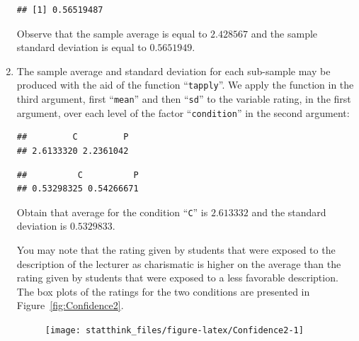 \documentclass[]{krantz}
\makeatletter
\newenvironment{Shaded}{\begin{snugshade}}{\end{snugshade}}
\newcommand{\KeywordTok}[1]{\textcolor[rgb]{0.13,0.29,0.53}{\textbf{#1}}}
\newcommand{\OperatorTok}[1]{\textcolor[rgb]{0.81,0.36,0.00}{\textbf{#1}}}
\newcommand{\NormalTok}[1]{#1}
\newenvironment{kframe}{%
\medskip{}
\setlength{\fboxsep}{.8em}
 \def\at@end@of@kframe{}%
 \ifinner\ifhmode%
  \def\at@end@of@kframe{\end{minipage}}%
  \begin{minipage}{\columnwidth}%
 \fi\fi%
 \def\FrameCommand##1{\hskip\@totalleftmargin \hskip-\fboxsep
 \colorbox{shadecolor}{##1}\hskip-\fboxsep
     \hskip-\linewidth \hskip-\@totalleftmargin \hskip\columnwidth}%
 \MakeFramed {\advance\hsize-\width
   \@totalleftmargin\z@ \linewidth\hsize
   \@setminipage}}%
 {\par\unskip\endMakeFramed%
 \at@end@of@kframe}
\renewenvironment{Shaded}{\begin{kframe}}{\end{kframe}}
\theoremstyle{definition}
\theoremstyle{definition}
\theoremstyle{definition}
\theoremstyle{remark}
\makeatother
\begin{document}
\begin{enumerate}
\begin{verbatim}
## [1] 0.56519487
\end{verbatim}

  Observe that the sample average is equal to \(2.428567\) and the
  sample standard deviation is equal to \(0.5651949\).
\item
  The sample average and standard deviation for each sub-sample may be
  produced with the aid of the function ``\texttt{tapply}''. We apply
  the function in the third argument, first ``\texttt{mean}'' and then
  ``\texttt{sd}'' to the variable rating, in the first argument, over
  each level of the factor ``\texttt{condition}'' in the second
  argument:

\begin{Shaded}
\end{Shaded}

\begin{verbatim}
##         C         P 
## 2.6133320 2.2361042
\end{verbatim}

\begin{Shaded}
\end{Shaded}

\begin{verbatim}
##          C          P 
## 0.53298325 0.54266671
\end{verbatim}

  Obtain that average for the condition ``\texttt{C}'' is \(2.613332\)
  and the standard deviation is \(0.5329833\).

  You may note that the rating given by students that were exposed to
  the description of the lecturer as charismatic is higher on the
  average than the rating given by students that were exposed to a less
  favorable description. The box plots of the ratings for the two
  conditions are presented in Figure~\ref{fig:Confidence2}.

  \begin{figure}

  {\centering \texttt{[image: statthink\_files/figure-latex/Confidence2-1]} 

}
\end{figure}
\end{enumerate}
\end{document}
